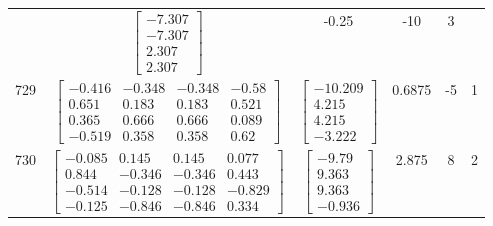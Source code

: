 \documentclass[a4paper,12pt]{article}
\begin{document}
\begin{tabular}{c c c c c c}
&
$\begin{bmatrix} -7.307 \\ -7.307 \\ 2.307 \\ 2.307 \end{bmatrix}$
&
-0.25
&
-10
&
3
\\
729
&
$\begin{bmatrix} -0.416 & -0.348 & -0.348 & -0.58 \\ 0.651 & 0.183 & 0.183 & 0.521 \\ 0.365 & 0.666 & 0.666 & 0.089 \\ -0.519 & 0.358 & 0.358 & 0.62 \end{bmatrix}$
&
$\begin{bmatrix} -10.209 \\ 4.215 \\ 4.215 \\ -3.222 \end{bmatrix}$
&
0.6875
&
-5
&
1
\\
730
&
$\begin{bmatrix} -0.085 & 0.145 & 0.145 & 0.077 \\ 0.844 & -0.346 & -0.346 & 0.443 \\ -0.514 & -0.128 & -0.128 & -0.829 \\ -0.125 & -0.846 & -0.846 & 0.334 \end{bmatrix}$
&
$\begin{bmatrix} -9.79 \\ 9.363 \\ 9.363 \\ -0.936 \end{bmatrix}$
&
2.875
&
8
&
2
\\
\end{tabular} \egroup \newpage
\end{document}

